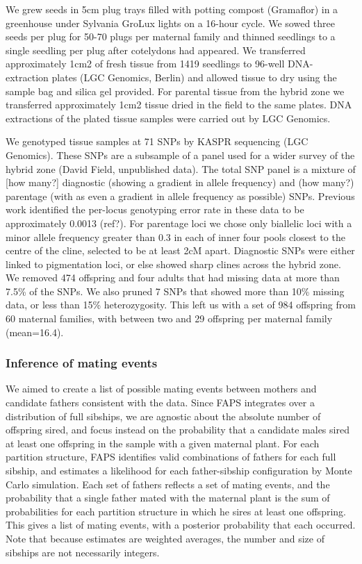\documentclass[10pt, a4paper, twocolumn]{article} %
\begin{document}
We grew seeds in 5cm plug trays filled with potting compost (Gramaflor) in a greenhouse under Sylvania GroLux lights on a 16-hour cycle. We sowed three seeds per plug for 50-70 plugs per maternal family and thinned seedlings to a single seedling per plug after cotelydons had appeared. We transferred approximately 1cm2 of fresh tissue from 1419 seedlings to 96-well DNA-extraction plates (LGC Genomics, Berlin) and allowed tissue to dry using the sample bag and silica gel provided. For parental tissue from the hybrid zone we transferred approximately 1cm2 tissue dried in the field to the same plates. DNA extractions of the plated tissue samples were carried out by LGC Genomics.

We genotyped tissue samples at 71 SNPs by KASPR sequencing (LGC Genomics). These SNPs are a subsample of a panel used for a wider survey of the hybrid zone (David Field, unpublished data). The total SNP panel is a mixture of [how many?] diagnostic (showing a gradient in allele frequency) and (how many?) parentage (with as even a gradient in allele frequency as possible) SNPs. Previous work identified the per-locus genotyping error rate  in these data to be approximately 0.0013 (ref?). For parentage loci we chose only biallelic loci with a minor allele frequency greater than 0.3 in each of inner four pools closest to the centre of the cline, selected to be at least 2cM apart. Diagnostic SNPs were either linked to pigmentation loci, or else showed sharp clines across the hybrid zone. We removed 474 offspring and four adults that had missing data at more than 7.5\% of the SNPs. We also pruned 7 SNPs that showed more than 10\% missing data, or less than 15\% heterozygosity. This left us with a set of 984 offspring from 60 maternal families, with between two and 29 offspring per maternal family (mean=16.4).

\subsubsection{Inference of mating events}

We aimed to create a list of possible mating events between mothers and candidate fathers consistent with the data. Since FAPS integrates over a distribution of full sibships, we are agnostic about the absolute number of offspring sired, and focus instead on the probability that a candidate males sired at least one offspring in the sample with a given maternal plant. For each partition structure, FAPS identifies valid combinations of fathers for each full sibship, and estimates a likelihood for each father-sibship configuration by Monte Carlo simulation. Each set of fathers reflects a set of mating events, and the probability that a single father mated with the maternal plant is the sum of probabilities for each partition structure in which he sires at least one offspring. This gives a list of mating events, with a posterior probability that each occurred. Note that because estimates are weighted averages, the number and size of sibships are not necessarily integers.
\end{document}
